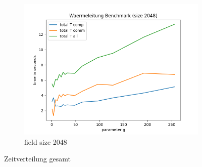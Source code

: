 \documentclass[12pt]{article}
\begin{document}
\begin{figure}[!htb]
    \begin{center}
        \begin{subfigure}{0.5\textwidth}
            \centering
            \includegraphics[scale=0.5]{../benchmark/plots/plot_total_2048.png}
            \caption{field size 2048}\label{fig:plot_2048_tot}
        \end{subfigure}
    \end{center}
	\caption{Zeitverteilung gesamt}
    \label{fig:all_time}
\end{figure}
\end{document}
